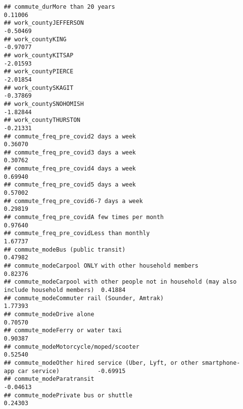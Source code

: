 \documentclass[
]{article}
\begin{document}
\begin{verbatim}
## commute_durMore than 20 years                                                                0.11006
## work_countyJEFFERSON                                                                        -0.50469
## work_countyKING                                                                             -0.97077
## work_countyKITSAP                                                                           -2.01593
## work_countyPIERCE                                                                           -2.01854
## work_countySKAGIT                                                                           -0.37869
## work_countySNOHOMISH                                                                        -1.82844
## work_countyTHURSTON                                                                         -0.21331
## commute_freq_pre_covid2 days a week                                                          0.36070
## commute_freq_pre_covid3 days a week                                                          0.30762
## commute_freq_pre_covid4 days a week                                                          0.69940
## commute_freq_pre_covid5 days a week                                                          0.57002
## commute_freq_pre_covid6-7 days a week                                                        0.29819
## commute_freq_pre_covidA few times per month                                                  0.97640
## commute_freq_pre_covidLess than monthly                                                      1.67737
## commute_modeBus (public transit)                                                             0.47982
## commute_modeCarpool ONLY with other household members                                        0.82376
## commute_modeCarpool with other people not in household (may also include household members)  0.41884
## commute_modeCommuter rail (Sounder, Amtrak)                                                  1.77393
## commute_modeDrive alone                                                                      0.70570
## commute_modeFerry or water taxi                                                              0.90387
## commute_modeMotorcycle/moped/scooter                                                         0.52540
## commute_modeOther hired service (Uber, Lyft, or other smartphone-app car service)           -0.69915
## commute_modeParatransit                                                                     -0.04613
## commute_modePrivate bus or shuttle                                                           0.24303

\end{verbatim}
\end{document}
